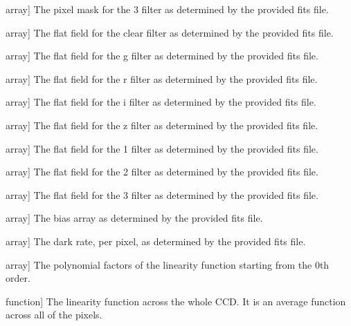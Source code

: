 \documentclass[letterpaper,11pt,english]{sphinxmanual}
\begin{document}
\begin{savenotes}
\begin{fulllineitems}
\begin{description}
\sphinxlineitem{mask\_3}{[}array{]}
\sphinxAtStartPar
The pixel mask for the 3 filter as determined by the provided
fits file.

\sphinxlineitem{flat\_c}{[}array{]}
\sphinxAtStartPar
The flat field for the clear filter as determined by the provided
fits file.

\sphinxlineitem{flat\_g}{[}array{]}
\sphinxAtStartPar
The flat field for the g filter as determined by the provided
fits file.

\sphinxlineitem{flat\_r}{[}array{]}
\sphinxAtStartPar
The flat field for the r filter as determined by the provided
fits file.

\sphinxlineitem{flat\_i}{[}array{]}
\sphinxAtStartPar
The flat field for the i filter as determined by the provided
fits file.

\sphinxlineitem{flat\_z}{[}array{]}
\sphinxAtStartPar
The flat field for the z filter as determined by the provided
fits file.

\sphinxlineitem{flat\_1}{[}array{]}
\sphinxAtStartPar
The flat field for the 1 filter as determined by the provided
fits file.

\sphinxlineitem{flat\_2}{[}array{]}
\sphinxAtStartPar
The flat field for the 2 filter as determined by the provided
fits file.

\sphinxlineitem{flat\_3}{[}array{]}
\sphinxAtStartPar
The flat field for the 3 filter as determined by the provided
fits file.

\sphinxlineitem{bias}{[}array{]}
\sphinxAtStartPar
The bias array as determined by the provided fits file.

\sphinxlineitem{dark\_current}{[}array{]}
\sphinxAtStartPar
The dark rate, per pixel, as determined by the provided fits file.

\sphinxlineitem{linearity\_factors}{[}array{]}
\sphinxAtStartPar
The polynomial factors of the linearity function starting from the
0th order.

\sphinxlineitem{linearity\_function}{[}function{]}
\sphinxAtStartPar
The linearity function across the whole CCD. It is an average function
across all of the pixels.

\end{description}


\end{fulllineitems}
\end{savenotes}
\end{document}
